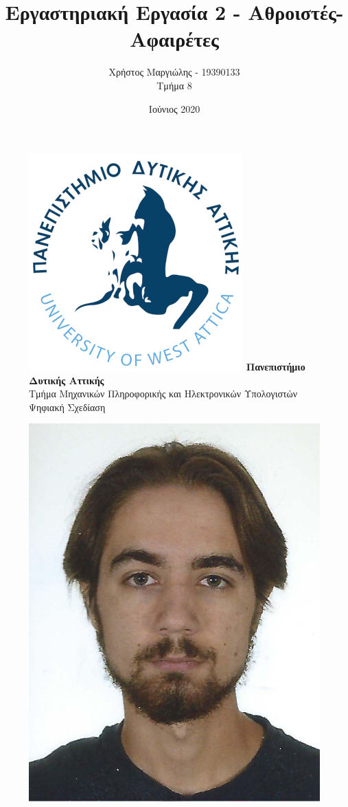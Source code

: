\documentclass{article}
\title{Εργαστηριακή Εργασία 2 - Αθροιστές-Αφαιρέτες}
\author{Χρήστος Μαργιώλης - 19390133 \\ Τμήμα 8}
\date{Ιούνιος 2020}
\begin{document}
\begin{figure}[t!]
    \centering
    \includegraphics[scale=0.3, center]{./res/Logo_University_of_West_Attica.png}
    \Large
    \textbf{Πανεπιστήμιο Δυτικής Αττικής} \\
    \large
    Τμήμα Μηχανικών Πληροφορικής και Ηλεκτρονικών Υπολογιστών \\
    Ψηφιακή Σχεδίαση
\end{figure}
\begin{figure}[b]
    \centering
    \includegraphics[scale=1]{./res/19390133.jpeg}
\end{figure}
\end{document}
